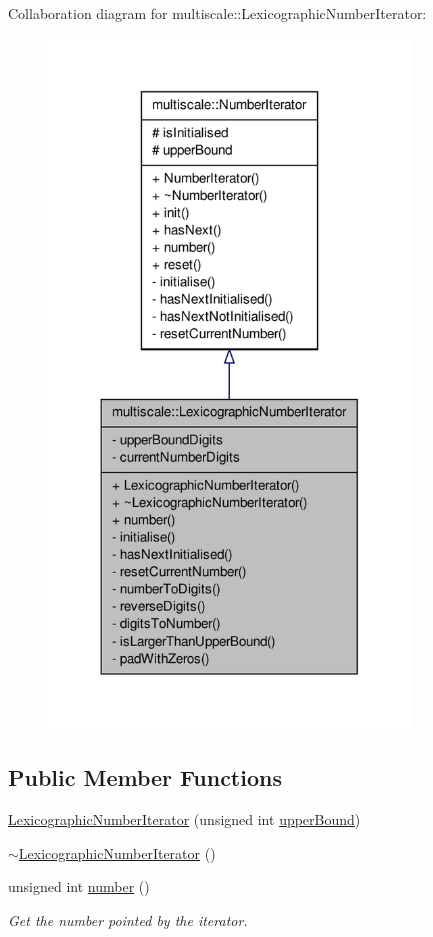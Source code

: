 \-Collaboration diagram for multiscale\-:\-:\-Lexicographic\-Number\-Iterator\-:
\nopagebreak
\begin{figure}[H]
\begin{center}
\leavevmode
\includegraphics[width=272pt]{classmultiscale_1_1LexicographicNumberIterator__coll__graph}
\end{center}
\end{figure}
\subsection*{\-Public \-Member \-Functions}
\begin{DoxyCompactItemize}
\item 
\hyperlink{classmultiscale_1_1LexicographicNumberIterator_a02a95a6f7876b84909e08555730ff08a}{\-Lexicographic\-Number\-Iterator} (unsigned int \hyperlink{classmultiscale_1_1NumberIterator_a56a5558958778bbde64e249d67cba886}{upper\-Bound})
\item 
\hyperlink{classmultiscale_1_1LexicographicNumberIterator_affe04d9733b7d0984a5ab3957cb0096a}{$\sim$\-Lexicographic\-Number\-Iterator} ()
\item 
unsigned int \hyperlink{classmultiscale_1_1LexicographicNumberIterator_a282d970d0d1a33d2736bbdf104c18336}{number} ()
\begin{DoxyCompactList}\small\item\em \-Get the number pointed by the iterator. \end{DoxyCompactList}\end{DoxyCompactItemize}
